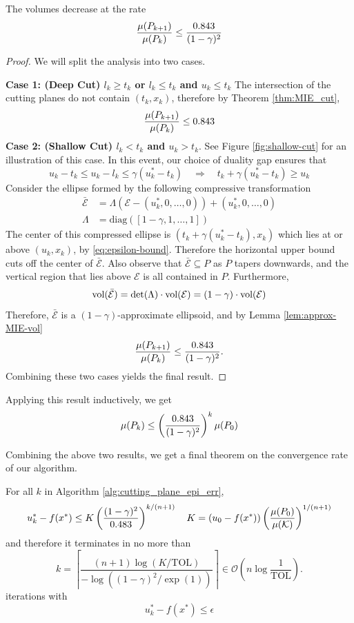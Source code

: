 \begin{lem}\label{Rate-Decrease2}
The volumes decrease at the rate
\[
\frac{\mu(P_{k+1})}{\mu(P_k)}\leq\frac{0.843}{(1-\gamma)^2}
\]
\end{lem}
\begin{proof}
We will split the analysis into two cases. 


\noindent\textbf{Case 1: (Deep Cut) $l_k \geq t_k$ or $l_k \leq t_k$ and $u_k \leq t_k$ } 
The intersection of the cutting planes do not contain $(t_k,x_k)$, therefore by Theorem \ref{thm:MIE_cut},
\[
\frac{\mu(P_{k+1})}{\mu(P_k)}\leq0.843
\]
\textbf{Case 2: (Shallow Cut) $l_k < t_k$ and $u_k > t_k$}. See Figure \ref{fig:shallow-cut} for an illustration of this case. In this event, our
choice of duality gap ensures that 
\begin{equation}\label{eq:epsilon-bound}
u_k-t_k \leq u_k-l_k\leq \gamma (u^*_k - t_k) \quad \Rightarrow \quad t_k 
+ \gamma (u^*_k - t_k) \geq u_k 
\end{equation}
Consider the ellipse formed by the following compressive transformation
\begin{align*}
\bar{\mathcal{E}} & =\Lambda\left(\mathcal{E}-(u^*_k,0,\dots,0)\right)+(u^*_k,0,\dots,0)\\
\Lambda & =\mbox{diag}([1-\gamma,1,\dots,1]) 
\end{align*}
The center of this compressed ellipse is $(t_k + \gamma(u^*_k - t_k),  x_k)$
which lies at or above $(u_k,  x_k)$, by \eqref{eq:epsilon-bound}. Therefore the horizontal upper bound cuts off the center of $\bar{\mathcal{E}}$. Also observe that
$\bar{\mathcal{E}}\subseteq P$ as $P$ tapers downwards, and the vertical region that lies above  $\mathcal{E}$ is all contained in $P$. Furthermore,
\[
\textnormal{vol}(\bar{\mathcal{E}})=\det(\Lambda)\cdot \textnormal{vol}(\mathcal{E}) =(1-\gamma)\cdot\textnormal{vol}(\mathcal{E})
\]
Therefore, $\bar{\mathcal{E}}$ is a $(1-\gamma)$-approximate ellipsoid, and by
Lemma \ref{lem:approx-MIE-vol}
\[
\frac{\mu(P_{k+1})}{\mu(P_k)}\leq\frac{0.843}{(1-\gamma)^2}.
\]
Combining these two cases yields the final result.
\end{proof}
%
Applying this result inductively, we get 
$$
\mu(P_{k})\leq\left(\frac{0.843}{(1-\gamma)^2}\right)^{k}\mu(P_{0})
$$

Combining the above two results, we get a final theorem on the convergence rate of our algorithm.
\begin{thm}\label{thm:CG-convergence}
For all $k$ in Algorithm \ref{alg:cutting_plane_epi_err},
\[
u_{k}^{*}-f(x^{*})\leq K\left(\frac{(1-\gamma)^{2}}{0.483}\right)^{k/(n+1)}\quad K=(u_{0}-f(x^{*}))\left(\frac{\mu(P_{0})}{\mu(\mathcal{K})}\right)^{1/(n+1)}
\]
and therefore it terminates in no more than
\[
k = \left\lceil \frac{(n+1)\log(K/\mbox{TOL})}{-\log((1-\gamma)^2/\exp(1))} \right\rceil 
\in \mathcal{O}\left(n\log\frac{1}{\mbox{TOL}}\right).
\]
iterations with $$u^*_k - f(x^*) \leq \epsilon$$

\end{thm}


